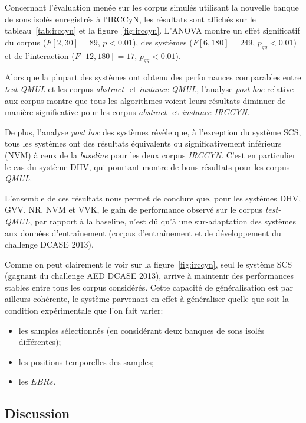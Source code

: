 Concernant l'évaluation menée sur les corpus simulés utilisant la nouvelle banque de sons isolés enregistrés à l'IRCCyN, les résultats sont affichés sur le tableau~\ref{tab:irccyn} et la figure~\ref{fig:irccyn}. L'ANOVA montre un effet significatif du corpus ($F[2,30]=89$, $p<0.01$), des systèmes ($F[6,180]=249$, $p_{gg}<0.01$) et de l'interaction ($F[12,180]=17$, $p_{gg}<0.01$).

Alors que la plupart des systèmes ont obtenu des performances comparables entre \emph{test-QMUL} et les corpus \emph{abstract-} et \emph{instance-QMUL}, l'analyse \emph{post hoc} relative aux corpus montre que tous les algorithmes voient leurs résultats diminuer de manière significative pour les corpus  \emph{abstract-} et \emph{instance-IRCCYN}.

De plus, l'analyse \emph{post hoc} des systèmes révèle que, à l'exception du système SCS, tous les systèmes ont des résultats équivalents ou significativement inférieurs (NVM) à ceux de la \emph{baseline} pour les deux corpus \emph{IRCCYN}. C'est en particulier le cas du système DHV, qui pourtant montre de bons résultats pour les corpus \emph{QMUL}.

L'ensemble de ces résultats nous permet de conclure que, pour les systèmes DHV, GVV, NR, NVM et VVK, le gain de performance observé sur le corpus \emph{test-QMUL}, par rapport à la baseline, n'est dû qu'à une sur-adaptation des systèmes aux données d'entraînement (corpus d'entraînement et de développement du challenge DCASE 2013). 

Comme on peut clairement le voir sur la figure~\ref{fig:irccyn}, seul le système SCS (gagnant du challenge AED DCASE 2013), arrive à maintenir des performances stables entre tous les corpus considérés. Cette capacité de généralisation est par ailleurs cohérente, le système parvenant en effet à généraliser quelle que soit la condition expérimentale que l'on fait varier: 

\begin{itemize}
\item les samples sélectionnés (en considérant deux banques de sons isolés différentes);
\item les positions temporelles des samples;
\item les $EBRs$.
\end{itemize}

\subsection{Discussion}

